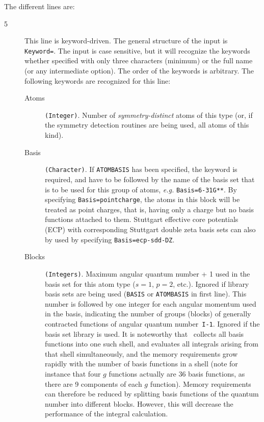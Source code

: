 The different lines are:
\begin{description}
\item[5] This line is keyword-driven. The general structure of the input is
\verb|Keyword=|. The input is case sensitive, but it will recognize
the keywords whether specified with only three characters (minimum) or
the full name (or any intermediate option). The order of the keywords
is arbitrary. The following keywords are
recognized for this line:
\begin{description}
\item[Atoms] \verb|(Integer)|. Number of {\em
  symmetry-distinct} atoms of 
this type (or, if the symmetry detection routines are being used, all
atoms of this kind).
\item[Basis] \verb|(Character)|. If \verb|ATOMBASIS| has been specified,
  the keyword is required, and have to be followed by the name of the
  basis set that is to be used for this group of atoms, {\it e.g.\/}
  \verb|Basis=6-31G**|. By specifying
  \verb|Basis=pointcharge|, the
  atoms in this block will be treated as point charges, that is,
  having only a charge but no basis functions attached to
  them. Stuttgart effective core potentials (ECP) with corresponding
  Stuttgart double zeta basis sets can also by used by specifying
  \verb|Basis=ecp-sdd-DZ|.
\item[Blocks] \verb|(Integers)|. Maximum angular quantum number + 1 used in the
basis set for this atom type ($s=1$, $p=2$, etc.).
Ignored if library basis sets are being used (\verb|BASIS| or
\verb|ATOMBASIS| in first line). This number is followed by one
integer for each angular momentum used in the basis, indicating 
the number of groups (blocks) of generally contracted
functions of angular quantum number~{\tt I-1}.
Ignored if the basis set library is used. \newline
It is noteworthy that
\dalton\ collects all basis functions into one such shell, and
evaluates all integrals arising from that 
shell simultaneously, and
the memory requirements grow rapidly with the number of basis
functions in a shell (note for instance that four $g$ functions
actually are 36
basis functions, as there are 9 components of each $g$
function). Memory requirements can therefore be reduced
by splitting
basis functions of the quantum number into different blocks. However,
this will decrease the performance of the
integral calculation.

\end{description}
\end{description}
